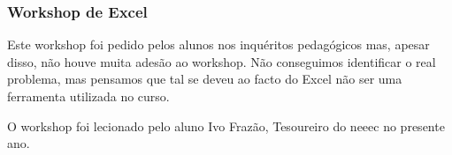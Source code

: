 
\subsubsection{Workshop de Excel}

Este workshop foi pedido pelos alunos nos inquéritos pedagógicos mas, apesar disso, não houve muita adesão ao workshop. Não conseguimos identificar o real problema, mas pensamos que tal se deveu ao facto do Excel não ser uma ferramenta utilizada no curso.

O workshop foi lecionado pelo aluno Ivo Frazão, Tesoureiro do \acrshort{neeec} no presente ano.
